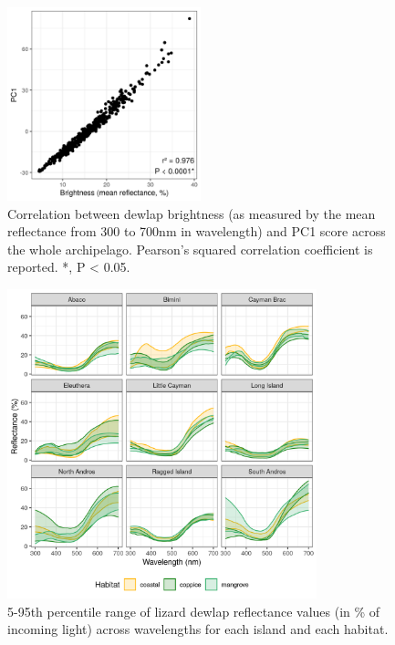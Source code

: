 \begin{figure}[H]
	\centering
	\includegraphics[width=0.5\textwidth]{"../analyses/03-PCA/figure_brightness_pooled"}
	\caption{Correlation between dewlap brightness (as measured by the mean reflectance from 300 to 700nm in wavelength) and PC1 score across the whole archipelago. Pearson's squared correlation coefficient is reported. *, P < 0.05.}
	\label{supfig:brightness_pooled}
\end{figure}

\begin{figure}[H]
	\centering
	\includegraphics[width=0.8\textwidth]{"../analyses/02-reflectance/figure_reflectance"}
	\caption{5-95th percentile range of lizard dewlap reflectance values (in \% of incoming light) across wavelengths for each island and each habitat.}
	\label{supfig:reflectance}
\end{figure}

